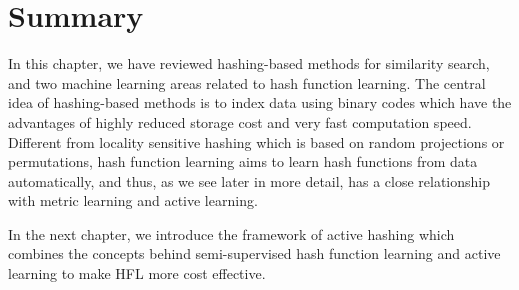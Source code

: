 \section{Summary}
\label{background:sum}
In this chapter, we have reviewed hashing-based methods for similarity search, and two machine learning areas related to hash function learning. The central idea of hashing-based methods is to index data using binary codes which have the advantages of highly reduced storage cost and very fast computation speed. Different from locality sensitive hashing which is based on random projections or permutations, hash function learning aims to learn hash functions from data automatically, and thus, as we see later in more detail, has a close relationship with metric learning and active learning.

In the next chapter, we introduce the framework of active hashing which combines the concepts behind semi-supervised hash function learning and active learning to make \mbox{HFL} more cost effective.


